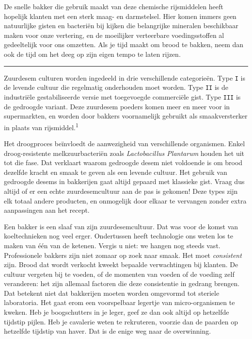 \documentclass[
  11pt,
  dutch,
]{memoir}
\begin{document}
De snelle bakker die gebruik maakt van deze chemische rijsmiddelen heeft
hopelijk klanten met een sterk maag- en darmstelsel. Hier komen immers
geen natuurlijke gisten en bacteriën bij kijken die belangrijke
mineralen beschikbaar maken voor onze vertering, en de moeilijker
verteerbare voedingsstoffen al gedeeltelijk voor ons omzetten. Als je
tijd maakt om brood te bakken, neem dan ook de tijd om het deeg op zijn
eigen tempo te laten rijzen.

\pfbreak

Zuurdesem culturen worden ingedeeld in drie verschillende categorieën.
Type \texttt{I} is de levende cultuur die regelmatig onderhouden moet
worden. Type \texttt{II} is de industriële gestabiliseerde versie met
toegevoegde commerciële gist. Type \texttt{III} is de gedroogde variant.
Deze zuurdesem poeders komen meer en meer voor in supermarkten, en
worden door bakkers voornamelijk gebruikt als smaakversterker in plaats
van rijsmiddel.\textsuperscript{1}

Het droogproces beïnvloedt de aanwezigheid van verschillende organismen.
Enkel droog-resistente melkzuurbacteriën zoals \emph{Lactobacillus
Plantarum} houden het uit tot die fase. Dat verklaart waarom gedroogde
desem niet voldoende is om brood dezelfde kracht en smaak te geven als
een levende cultuur. Het gebruik van gedroogde desems in bakkerijen gaat
altijd gepaard met klassieke gist. Vraag dus altijd of er een echte
zuurdesemcultuur aan de pas is gekomen! Deze types zijn elk totaal
andere producten, en onmogelijk door elkaar te vervangen zonder extra
aanpassingen aan het recept.

Een bakker is een slaaf van zijn zuurdesemcultuur. Dat was voor de komst
van koeltechnieken nog veel erger. Ondertussen heeft technologie ons
weten los te maken van één van de ketenen. Vergis u niet: we hangen nog
steeds vast. Professionele bakkers zijn niet zomaar op zoek naar smaak.
Het moet \emph{consistent} zijn. Brood dat wordt verkocht kweekt
bepaalde verwachtingen bij klanten. De cultuur vergeten bij te voeden,
of de momenten van voeden of de voeding zelf veranderen: het zijn
allemaal factoren die deze consistentie in gedrang brengen. Dat betekent
niet dat bakkerijen moeten worden omgevormd tot steriele laboratoria.
Het gaat erom een voorspelbaar legertje van micro-organismen te kweken.
Heb je boogschutters in je leger, geef ze dan ook altijd op hetzelfde
tijdstip pijlen. Heb je cavalerie weten te rekruteren, voorzie dan de
paarden op hetzelfde tijdstip van haver. Dat is de enige weg naar de
overwinning.
\end{document}
